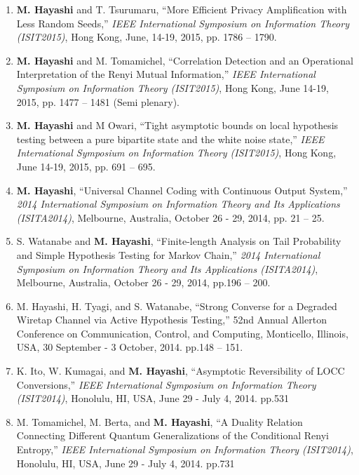 \documentclass[a4paper,12pt,oneside]{article}
\begin{document}
\begin{enumerate}
\item 
\textbf{M. Hayashi} and T. Tsurumaru, 
``More Efficient Privacy Amplification with Less Random Seeds,'' 
{\em IEEE International Symposium on Information Theory (ISIT2015)},
Hong Kong, June, 14-19, 2015, pp. 1786 -- 1790.

\item 
\textbf{M. Hayashi} and M. Tomamichel, 
``Correlation Detection and an Operational Interpretation of the Renyi Mutual Information,'' 
{\em IEEE International Symposium on Information Theory (ISIT2015)},
Hong Kong, June 14-19, 2015, pp. 1477 -- 1481 (Semi plenary).

\item 
\textbf{M. Hayashi} and M Owari, 
``Tight asymptotic bounds on local hypothesis testing between a pure bipartite state and the white noise state,'' 
{\em IEEE International Symposium on Information Theory (ISIT2015)},
Hong Kong, June 14-19, 2015, pp. 691 -- 695.

\item 
\textbf{M. Hayashi},
``Universal Channel Coding with Continuous Output System,'' 
{\em 2014 International Symposium on Information Theory and Its Applications (ISITA2014)}, Melbourne, Australia, October 26 - 29, 2014, pp. 21 -- 25.

\item 
S. Watanabe and \textbf{M. Hayashi},
``Finite-length Analysis on Tail Probability and Simple Hypothesis Testing for Markov Chain,'' 
{\em 2014 International Symposium on Information Theory and Its Applications (ISITA2014)}, Melbourne, Australia, October 26 - 29, 2014, pp.196 -- 200.

\item 
M. Hayashi, H. Tyagi, and S. Watanabe, ``Strong Converse for a Degraded Wiretap Channel via Active Hypothesis Testing,'' 52nd Annual Allerton Conference on Communication, Control, and Computing, Monticello, Illinois, USA, 30 September - 3 October, 2014. pp.148 -- 151.

\item 
K. Ito, W. Kumagai, and \textbf{M. Hayashi}, 
``Asymptotic Reversibility of LOCC Conversions,'' 
{\em IEEE International Symposium on Information Theory (ISIT2014)}, Honolulu, HI, USA, June 29 - July 4, 
2014. pp.531

\item 
M. Tomamichel, M. Berta, and \textbf{M. Hayashi}, 
``A Duality Relation Connecting Different Quantum Generalizations of the Conditional Renyi Entropy,'' 
{\em IEEE International Symposium on Information Theory (ISIT2014)}, 
Honolulu, HI, USA, June 29 - July 4, 2014. pp.731


\end{enumerate}
\end{document}
